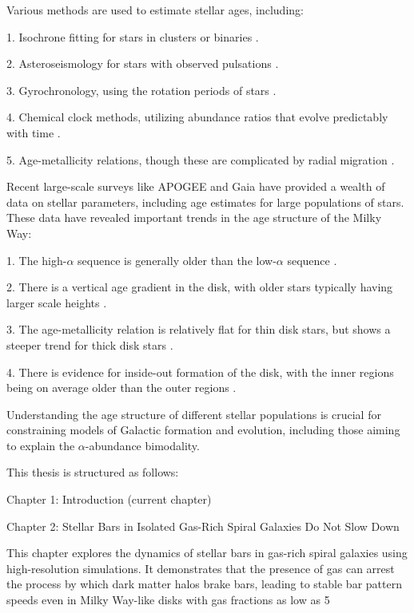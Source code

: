 Various methods are used to estimate stellar ages, including:

1. Isochrone fitting for stars in clusters or binaries \citep{2017ApJ...837..162C}.

2. Asteroseismology for stars with observed pulsations \citep{2013ARA&A..51..353C}.

3. Gyrochronology, using the rotation periods of stars \citep{2007ApJ...669.1167B}.

4. Chemical clock methods, utilizing abundance ratios that evolve predictably with time \citep{2016A&A...593A..65J}.

5. Age-metallicity relations, though these are complicated by radial migration \citep{2013A&A...558A...9M}.

Recent large-scale surveys like APOGEE \citep{2017AJ....154...94M} and Gaia \citep{2016A&A...595A...1G} have provided a wealth of data on stellar parameters, including age estimates for large populations of stars. These data have revealed important trends in the age structure of the Milky Way:

1. The high-$\alpha$ sequence is generally older than the low-$\alpha$ sequence \citep{2013A&A...560A.109H}.

2. There is a vertical age gradient in the disk, with older stars typically having larger scale heights \citep{2016ARA&A..54..529B}.

3. The age-metallicity relation is relatively flat for thin disk stars, but shows a steeper trend for thick disk stars \citep{2019A&A...623A..60S}.

4. There is evidence for inside-out formation of the disk, with the inner regions being on average older than the outer regions \citep{2015ApJ...808..132H}.

Understanding the age structure of different stellar populations is crucial for constraining models of Galactic formation and evolution, including those aiming to explain the $\alpha$-abundance bimodality.


This thesis is structured as follows:

Chapter 1: Introduction (current chapter)

Chapter 2: Stellar Bars in Isolated Gas-Rich Spiral Galaxies Do Not Slow Down

This chapter explores the dynamics of stellar bars in gas-rich spiral galaxies using high-resolution simulations. It demonstrates that the presence of gas can arrest the process by which dark matter halos brake bars, leading to stable bar pattern speeds even in Milky Way-like disks with gas fractions as low as 5%

